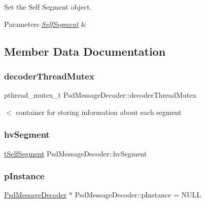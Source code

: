 Set the Self Segment object. 


\begin{DoxyParams}{Parameters}
{\em \hyperlink{struct_self_segment}{Self\+Segment}} & \\
\hline
\end{DoxyParams}


\subsection{Member Data Documentation}
\mbox{\label{class_psd_message_decoder_abc9826f6bfccc7d97fea196adf86710c}} 
\subsubsection{\texorpdfstring{decoder\+Thread\+Mutex}{decoderThreadMutex}}
{\footnotesize\ttfamily pthread\+\_\+mutex\+\_\+t Psd\+Message\+Decoder\+::decoder\+Thread\+Mutex}

$<$ container for storing information about each segment \mbox{\label{class_psd_message_decoder_a919e19a64a59b17651a5dbbd825fc14a}} 
\subsubsection{\texorpdfstring{hv\+Segment}{hvSegment}}
{\footnotesize\ttfamily \hyperlink{_psd_message_decoder_8h_a6c858ba8556a68d900d0eca9dc406232}{t\+Self\+Segment} Psd\+Message\+Decoder\+::hv\+Segment}

\mbox{\label{class_psd_message_decoder_ad1944184b781d22c108add0c2cbdb166}} 
\subsubsection{\texorpdfstring{p\+Instance}{pInstance}}
{\footnotesize\ttfamily \hyperlink{class_psd_message_decoder}{Psd\+Message\+Decoder} $\ast$ Psd\+Message\+Decoder\+::p\+Instance = N\+U\+LL\hspace{0.3cm}{\ttfamily [static]}}

